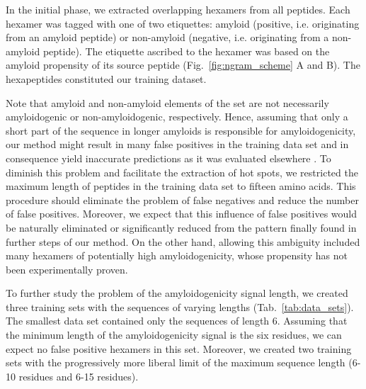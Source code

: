 \documentclass[fleqn,10pt,twoside]{gcb15submission}
\begin{document}
In the initial phase, we extracted overlapping hexamers from all peptides. Each 
hexamer was tagged with one of two etiquettes: amyloid (positive, i.e. 
originating from an amyloid peptide) or non-amyloid (negative, i.e. originating 
from a non-amyloid peptide). The etiquette ascribed to the hexamer was based on 
the amyloid propensity of its source peptide (Fig.~\ref{fig:ngram_scheme} A and 
B). The hexapeptides constituted our training dataset. 

  Note that amyloid and non-amyloid elements of the set are not necessarily 
amyloidogenic or non-amyloidogenic, respectively. Hence, assuming that only a 
short part of the sequence in longer amyloids is responsible for 
amyloidogenicity, our method might result in many false positives in the 
training data set and in consequence yield inaccurate predictions as it was 
evaluated elsewhere \citep{kotulska_amyloid_2013}. To diminish this problem and 
facilitate the extraction of hot spots, we restricted the maximum length of 
peptides in the training data set to fifteen amino acids. This procedure should 
eliminate the problem of false negatives and reduce the number of false 
positives. Moreover, we expect that this  influence of false positives  would be 
naturally eliminated or significantly reduced from the pattern finally found in 
further steps of our method. On the other hand, allowing this ambiguity included 
many hexamers of potentially high amyloidogenicity, whose propensity has not 
been experimentally proven. 
%
%
%
%
%

  To further study the problem of the amyloidogenicity signal length, we created 
three training sets with the sequences of varying lengths 
%
%
%
%
%
(Tab.~\ref{tab:data_sets}). The smallest data set contained only the sequences 
of length 6. Assuming that the minimum length of the amyloidogenicity signal is 
the six residues, we can expect no false positive hexamers in this set. Moreover, we created 
two training sets with the progressively more liberal limit of the maximum 
sequence length (6-10 residues and 6-15 residues).
\end{document}
